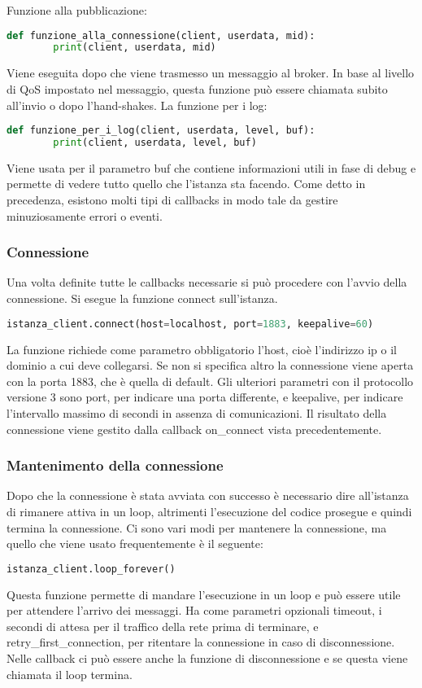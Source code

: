 Funzione alla pubblicazione:
\begin{lstlisting}[language=python]
	def funzione_alla_connessione(client, userdata, mid):
		print(client, userdata, mid)
\end{lstlisting}
Viene eseguita dopo che viene trasmesso un messaggio al broker.
In base al livello di QoS impostato nel messaggio, questa funzione può essere chiamata subito all'invio o dopo l'hand-shakes.\newline
La funzione per i log:
\begin{lstlisting}[language=python]
	def funzione_per_i_log(client, userdata, level, buf):
		print(client, userdata, level, buf)
\end{lstlisting}
Viene usata per il parametro buf che contiene informazioni utili in fase di debug
e permette di vedere tutto quello che l'istanza sta facendo.\newline
Come detto in precedenza, esistono molti tipi di callbacks in modo tale da gestire minuziosamente errori o eventi.

\subsubsection{Connessione}
\label{subsubsec:client-creazione-connesione-connessione}
Una volta definite tutte le callbacks necessarie si può procedere con l'avvio della connessione.
Si esegue la funzione connect sull'istanza.
\begin{lstlisting}[language=python]
	istanza_client.connect(host=localhost, port=1883, keepalive=60)
\end{lstlisting}
La funzione richiede come parametro obbligatorio l'host, cioè l'indirizzo ip o il dominio a cui deve collegarsi.
Se non si specifica altro la connessione viene aperta con la porta 1883, che è quella di default.
Gli ulteriori parametri con il protocollo versione 3 sono port, per indicare una porta differente,
e keepalive, per indicare l'intervallo massimo di secondi in assenza di comunicazioni.
Il risultato della connessione viene gestito dalla callback on\_connect vista precedentemente.

\subsubsection{Mantenimento della connessione}
\label{subsubsec:client-creazione-connesione-mantenimento}
Dopo che la connessione è stata avviata con successo è necessario dire all'istanza di rimanere attiva in un loop,
altrimenti l'esecuzione del codice prosegue e quindi termina la connessione.
Ci sono vari modi per mantenere la connessione, ma quello che viene usato frequentemente è il seguente:
\begin{lstlisting}[language=python]
	istanza_client.loop_forever()
\end{lstlisting}
Questa funzione permette di mandare l'esecuzione in un loop e può essere utile per attendere l'arrivo dei messaggi.
Ha come parametri opzionali timeout, i secondi di attesa per il traffico della rete prima di terminare, e
retry\_first\_connection, per ritentare la connessione in caso di disconnessione.
Nelle callback ci può essere anche la funzione di disconnessione e se questa viene chiamata il loop termina.

